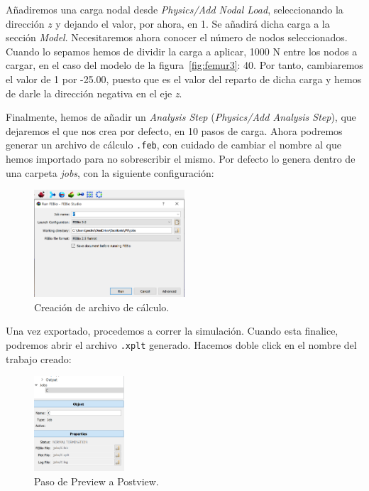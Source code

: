 Añadiremos una carga nodal desde \emph{Physics/Add Nodal Load}, seleccionando la dirección $z$ y dejando el valor, por ahora, en 1. Se añadirá dicha carga a la sección \emph{Model}. Necesitaremos ahora conocer el número de nodos seleccionados. Cuando lo sepamos hemos de dividir la carga a aplicar, 1000 N entre los nodos a cargar, en el caso del modelo de la figura~\ref{fig:femur3}: 40. Por tanto, cambiaremos el valor de 1 por -25.00, puesto que es el valor del reparto de dicha carga y hemos de darle la dirección negativa en el  eje \emph{z}.

Finalmente, hemos de añadir un \emph{Analysis Step} (\emph{Physics/Add Analysis Step}), que dejaremos el que nos crea por defecto, en 10 pasos de carga. Ahora podremos generar un archivo  de cálculo \texttt{.feb}, con cuidado de cambiar el nombre al que hemos importado para no sobrescribir el mismo. Por defecto lo genera dentro de una carpeta \emph{jobs}, con la siguiente configuración:

\clearpage
 \begin{figure}[!htp]
\centering
\includegraphics[width=0.5\textwidth]{figuras_2/femur_run.png}
\caption{Creación de archivo de cálculo.}
\label{fig:femur_run}
\end{figure}

Una vez exportado, procedemos a correr la simulación. Cuando esta finalice, podremos abrir el archivo  \texttt{.xplt} generado. Hacemos doble click en el nombre del trabajo creado:

 \begin{figure}[!htp]
\centering
\includegraphics[width=0.3\textwidth]{figuras_2/femur_open.png}
\caption{Paso de Preview a Postview.}
\label{fig:femur_open}
\end{figure}

